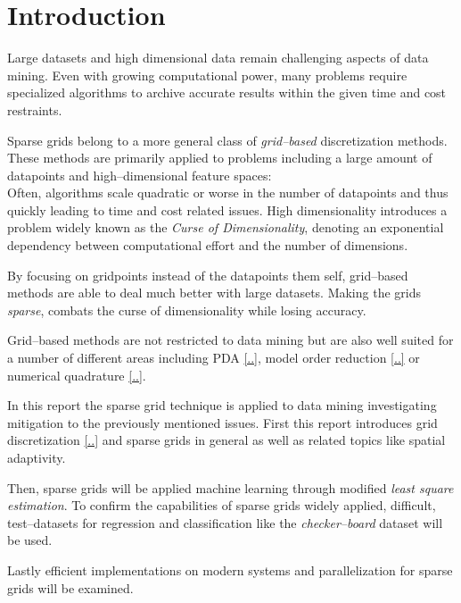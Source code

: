 \section{Introduction}
Large datasets and high dimensional data remain challenging aspects of data
mining. Even with growing computational power, many problems require
specialized algorithms to archive accurate results within the given time and 
cost restraints.

\par

Sparse grids belong to a more general class of \emph{grid--based}
discretization methods. These methods are primarily applied to
problems including a large amount of datapoints and high--dimensional
feature spaces:
\\
Often, algorithms scale quadratic or worse in the number of datapoints and
thus quickly leading to time and cost related issues.
High dimensionality introduces a problem widely known as the \emph{Curse of
Dimensionality}, denoting an exponential dependency between computational
effort and the number of dimensions.

\par

By focusing on gridpoints instead of the datapoints them self, grid--based
methods are able to deal much better with large datasets. Making the grids
\emph{sparse}, combats the curse of dimensionality while losing accuracy.

\par

Grid--based methods are not restricted to data mining but are also well
suited for a number of different areas including PDA \ref{..}, model order
reduction \ref{..} or numerical quadrature \ref{..}.


In this report the sparse grid technique is applied to data mining
investigating mitigation to the previously mentioned issues.
First this report introduces grid discretization \ref{..} and sparse grids in
general as well as related topics like spatial adaptivity.

Then, sparse grids will be applied machine learning
through modified \emph{least square estimation}. To confirm the capabilities
of sparse grids widely applied, difficult,
test--datasets for regression and classification like the
\emph{checker--board} dataset will be used.

Lastly  efficient implementations on modern systems and parallelization for
sparse grids will be examined.

